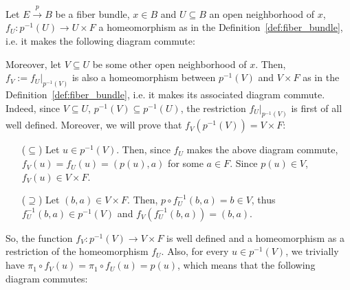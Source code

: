 \begin{remark}\label{rem:fiber_subcover} Let $E\overset{p}{\to} B$ be a fiber bundle, $x\in B$ and $U\subseteq B$ an open neighborhood of $x$, $f_U:p^{-1}(U)\to U\times F$ a homeomorphism as in the Definition~\ref{def:fiber_bundle}, i.e. it makes the following diagram commute:
\begin{center}
\end{center}
Moreover, let $V\subseteq U$ be some other open neighborhood of $x$. Then, $f_V:=f_U|_{p^{-1}(V)}$ is also a homeomorphism between $p^{-1}(V)$ and $V\times F$ as in the Definition~\ref{def:fiber_bundle}, i.e. it makes its associated diagram commute. Indeed, since $V\subseteq U$, $p^{-1}(V)\subseteq p^{-1}(U)$, the restriction $f_U|_{p^{-1}(V)}$ is first of all well defined. Moreover, we will prove that $f_V(p^{-1}(V))=V\times F$:
\begin{itemize}
\item[($\subseteq$)] Let $u\in p^{-1}(V)$. Then, since $f_U$ makes the above diagram commute, $f_V(u)=f_U(u)=(p(u),a)$ for some $a\in F$. Since $p(u)\in V$, $f_V(u)\in V\times F$.
\item[($\supseteq$)] Let $(b,a)\in V\times F$. Then, $p\circ f_U^{-1}(b,a)=b\in V$, thus $f_U^{-1}(b,a)\in p^{-1}(V)$ and $f_V(f_U^{-1}(b,a))=(b,a)$.
\end{itemize}
So, the function $f_V:p^{-1}(V)\to V\times F$ is well defined and a homeomorphism as a restriction of the homeomorphism $f_U$. Also, for every $u\in p^{-1}(V)$, we trivially have $\pi_1\circ f_V(u)=\pi_1\circ f_U(u)=p(u)$, which means that the following diagram commutes:
\begin{center}
\end{center}
\end{remark}

